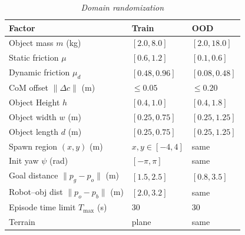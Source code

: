 \begin{table}[t]
\centering
\caption{\textit{Domain randomization}}
\label{tab:domain_rand}
\renewcommand{\arraystretch}{1.05}
\setlength{\tabcolsep}{4pt}
\small
\begin{tabular}{@{}p{4.05cm}p{2.05cm}p{2.05cm}@{}}
\toprule
\textbf{Factor} & \textbf{Train}  & \textbf{OOD} \\
\midrule
Object mass $m$ (kg) & $[2.0,8.0]$  & $[2.0,18.0]$ \\
Static friction $\mu$ & $[0.6,1.2]$  & $[0.1,0.6]$ \\
Dynamic friction $\mu_d$ & $[0.48, 0.96]$ & $[0.08, 0.48]$ \\
CoM offset $\|\Delta c\|$ (m) & $\le 0.05$ & $\le 0.20$ \\
\midrule
Object Height $h$ & $[0.4,1.0]$  & $[0.4,1.8]$ \\
Object width $w$ (m) & $[0.25, 0.75]$ & $[0.25, 1.25]$ \\
Object length $d$ (m) & $[0.25, 0.75]$ & $[0.25, 1.25]$ \\
\midrule
Spawn region $(x,y)$ (m) & $x,y \in [-4,4]$ & same \\
Init yaw $\psi$ (rad) & $[-\pi,\pi]$ & same \\
\midrule
Goal distance $\|p_g-p_o\|$ (m) & $[1.5,2.5]$  & $[0.8,3.5]$ \\
Robot--obj dist $\|p_o-p_b\|$ (m) & $[2.0,3.2]$  & same \\
Episode time limit $T_{\max}$ (s) & 30 & 30 \\
\midrule
Terrain & plane & same \\
\bottomrule
\end{tabular}
\end{table}









